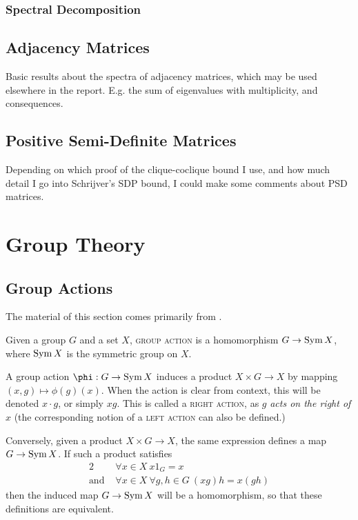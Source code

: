 \documentclass{report}
\begin{document}
    \subsection{Spectral Decomposition}

  \section{Adjacency Matrices}
    Basic results about the spectra of adjacency matrices, which may be used
    elsewhere in the report.  E.g. the sum of eigenvalues with multiplicity, and
    consequences.

  \section{Positive Semi-Definite Matrices}
    Depending on which proof of the clique-coclique bound I use, and how much
    detail I go into Schrijver's SDP bound, I could make some comments about PSD
    matrices.

\chapter{Group Theory}
  \section{Group Actions}
    The material of this section comes primarily from \cite[Section~1.7;
    Chapter~4]{dummit-foote}.

    \begin{defn}\label{group-action}
      Given a group $G$ and a set $X$,
      \textsc{group action} is a homomorphism $G \to \operatorname{Sym} X$,
      where $\operatorname{Sym} X$ is the symmetric group on $X$.
    \end{defn}

    A group action $\phi: G \to \Sym X$ induces a product
    $X \times G \to X$ by mapping $(x, g) \mapsto \phi(g)(x)$.
    When the action is clear from context,
    this will be denoted $x \cdot g$, or simply $xg$.
    This is called a \textsc{right action},
    as $g$ \textit{acts on the right of} $x$
    (the corresponding notion of a \textsc{left action}
    can also be defined.)

    Conversely, given a product $X \times G \to X$,
    the same expression defines a map $G \to \operatorname{Sym} X$.
    If such a product satisfies
    \begin{alignat*}{2}
      &\forall x \in X\ x 1_G = x \\
      \text{and } &\forall x \in X\ \forall g, h \in G\
        (x g) h = x(gh)
    \end{alignat*}
    then the induced map $G \to \operatorname{Sym} X$ will be a homomorphism,
    so that these definitions are equivalent.
\end{document}
